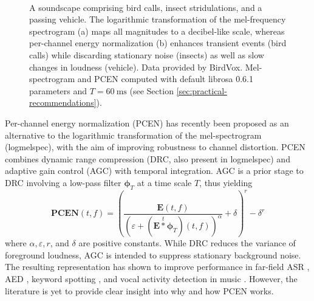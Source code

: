 \documentclass[journal]{IEEEtran}
\theoremstyle{remark}
\begin{document}
\begin{figure}
\centering
{}\\
\caption{A soundscape comprising bird calls, insect stridulations, and a passing vehicle.
The logarithmic transformation of the mel-frequency spectrogram (a) maps all magnitudes to a decibel-like scale, whereas per-channel energy normalization (b) enhances transient events (bird calls) while discarding stationary noise (insects) as well as slow changes in loudness (vehicle). Data provided by BirdVox. Mel-spectrogram and PCEN computed with default librosa 0.6.1 parameters and $T=\SI{60}{\milli\second}$ (see Section \ref{sec:practical-recommendations}).}
\label{fig:spectrogram}
\end{figure} 

Per-channel energy normalization (PCEN) \cite{wang2017icassp} has recently been proposed as an alternative to the logarithmic transformation of the mel-spectrogram (logmelspec), with the aim of improving robustness to channel distortion.
PCEN combines dynamic range compression (DRC, also present in logmelspec) and adaptive gain control (AGC) with temporal integration. AGC is a prior stage to DRC involving a low-pass filter $\mathbf{\phi}_T$ at a time scale $T$, thus yielding
\begin{equation}
\mathbf{PCEN}(t,f) =
\left(\dfrac{\mathbf{E}(t,f)}{(\varepsilon+(\mathbf{E}\overset{t}{\ast}\boldsymbol{\phi}_T)(t,f))^\alpha} + \delta\right)^r - \delta^r
\end{equation}
where $\alpha, \varepsilon, r$, and $\delta$ are positive constants.
While DRC reduces the variance of foreground loudness, AGC is intended to suppress stationary background noise.
The resulting representation has shown to improve performance in far-field ASR \cite{battenberg2017arxiv}, AED \cite{krstulovic2018casse}, keyword spotting \cite{wang2017icassp, shan2018attention}, and vocal activity detection in music \cite{schluter2018ismir}. However, the literature is yet to provide clear insight into why and how PCEN works.
\end{document}
